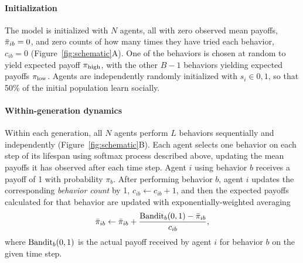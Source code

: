 \documentclass[letterpaper,11.5pt]{scrartcl}
\begin{document}
\paragraph{Initialization}

The model is initialized with $N$ agents, all with zero observed mean payoffs, 
$\bar\pi_{ib} = 0$, and zero counts of how many times
they have tried each behavior, $c_{ib} = 0$ (Figure~\ref{fig:schematic}A).
One of the behaviors is chosen at random to yield expected payoff $\pi_{\mathrm{high}}$, with the other $B-1$ behaviors yielding
expected payoffs $\pi_{\mathrm{low}}$. Agents are independently randomly initialized with $s_i
\in 0,1$, so that 50\% of the initial population learn socially.


\paragraph{Within-generation dynamics}

Within each generation, all $N$ agents perform $L$ behaviors sequentially and
independently (Figure~\ref{fig:schematic}B).
Each agent selects one behavior on each step of its lifespan using softmax process
described above, updating the mean payoffs it has observed after each time step. Agent $i$ using behavior $b$ receives a payoff of 1 with probability $\pi_b$. 
After performing behavior $b$, agent $i$ updates the
corresponding \emph{behavior count} by 1, $c_{ib} \leftarrow c_{ib} + 1$, and then
the expected payoffs calculated for that behavior are updated with
exponentially-weighted averaging
\begin{equation}
  \bar\pi_{ib} \leftarrow \bar\pi_{ib} + \frac{\text{Bandit}_b(0, 1) - \bar\pi_{ib}}{c_{ib}},
\end{equation}
\noindent
where $\text{Bandit}_b(0, 1)$ is the actual payoff received by agent $i$ for behavior $b$ on the given time step. 
\end{document}
